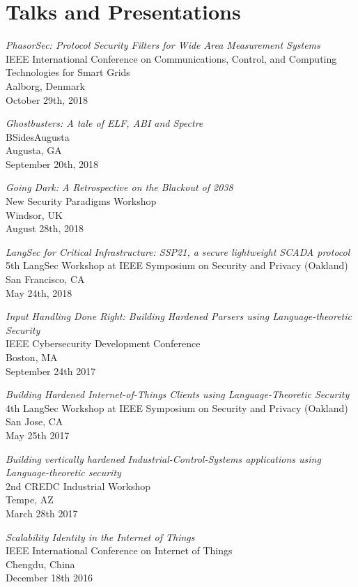 \documentclass[letterpaper,10pt]{article}
\renewenvironment{itemize}{
  \begin{list}{}{
    \setlength{\leftmargin}{1.5em}
  }
}{
  \end{list}
}
\begin{document}
\section*{Talks and Presentations}
\begin{itemize}
\setlength\itemsep{0ex}
\item \textit{PhasorSec: Protocol Security Filters for Wide Area Measurement Systems} \\ IEEE International Conference on Communications, Control, and Computing Technologies for Smart Grids \\ Aalborg, Denmark \\ October 29th, 2018
\item \textit{Ghostbusters: A tale of ELF, ABI and Spectre} \\ BSidesAugusta\\ Augusta, GA \\ September 20th, 2018
\item \textit{Going Dark: A Retrospective on the Blackout of 2038} \\ New Security Paradigms Workshop \\ Windsor, UK \\ August 28th, 2018
\item \textit{LangSec for Critical Infrastructure: SSP21, a secure lightweight SCADA protocol} \\ 5th LangSec Workshop at IEEE Symposium on Security and Privacy (Oakland)\\ San Francisco, CA\\ May 24th, 2018
\item \textit{Input Handling Done Right: Building Hardened Parsers using Language-theoretic Security} \\ IEEE Cybersecurity Development Conference\\ Boston, MA\\ September 24th 2017
\item \textit{Building Hardened Internet-of-Things Clients using Language-Theoretic Security}\\ 4th LangSec Workshop at IEEE Symposium on Security and Privacy (Oakland)\\ San Jose, CA\\ May 25th 2017
\item \textit{Building vertically hardened Industrial-Control-Systems applications using Language-theoretic security}\\ 2nd CREDC Industrial Workshop\\ Tempe, AZ\\ March 28th 2017
\item \textit{Scalability Identity in the Internet of Things}\\ IEEE International Conference on Internet of Things\\ Chengdu, China\\ December 18th 2016
\end{itemize}
\end{document}
